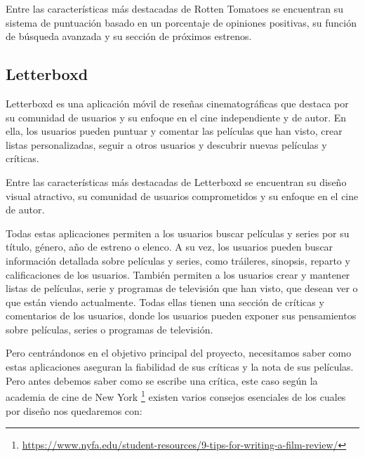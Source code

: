 Entre las características más destacadas de Rotten Tomatoes se encuentran su sistema de puntuación 
basado en un porcentaje de opiniones positivas, su función de búsqueda avanzada y su sección de 
próximos estrenos.

\subsection{Letterboxd}

Letterboxd es una aplicación móvil de reseñas cinematográficas que destaca por su comunidad de 
usuarios y su enfoque en el cine independiente y de autor. En ella, los usuarios pueden puntuar y 
comentar las películas que han visto, crear listas personalizadas, seguir a otros usuarios y descubrir 
nuevas películas y críticas.

Entre las características más destacadas de Letterboxd se encuentran su diseño visual atractivo, su 
comunidad de usuarios comprometidos y su enfoque en el cine de autor.

Todas estas aplicaciones permiten a los usuarios buscar películas y series por su título, género, año 
de estreno o elenco. A su vez, los usuarios pueden buscar información detallada sobre películas y 
series, como tráileres, sinopsis, reparto y calificaciones de los usuarios. También permiten a los 
usuarios crear y mantener listas de películas, serie y programas de televisión que han visto, que 
desean ver o que están viendo actualmente. Todas ellas tienen una sección de críticas y comentarios de 
los usuarios, donde los usuarios pueden exponer sus pensamientos sobre películas, series o programas 
de televisión.

Pero centrándonos en el objetivo principal del proyecto, necesitamos saber como estas aplicaciones aseguran la fiabilidad de sus críticas y la nota de sus películas. Pero antes debemos saber como se escribe una crítica, este caso según la academia de cine de New York \footnote{\url{https://www.nyfa.edu/student-resources/9-tips-for-writing-a-film-review/}} existen varios consejos esenciales de los cuales por diseño nos quedaremos con:

